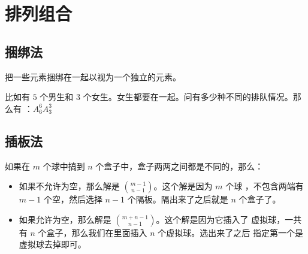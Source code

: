 \section{排列组合}
\label{sec:排列组合基本方法}



\subsection{捆绑法}

把一些元素捆绑在一起以视为一个独立的元素。

比如有 $5$ 个男生和 $3$ 个女生。女生都要在一起。问有多少种不同的排队情况。那么有
：$A_6^6 A_3^3$



\subsection{插板法}
\label{subsec:插板法} \label{subsec:插空法}

如果在 $m$ 个球中搞到 $n$ 个盒子中，盒子两两之间都是不同的，那么：
\begin{itemize}
    \item 如果不允许为空，那么解是 $m - 1 \choose n - 1$。这个解是因为 $m$ 个球
        ，不包含两端有 $m - 1$ 个空，然后选择 $n - 1$ 个隔板。隔出来了之后就是
        $n$ 个盒子了。
    \item 如果允许为空，那么解是 $m + n - 1 \choose n - 1$。这个解是因为它插入了
        虚拟球，一共有 $n$ 个盒子，那么我们在里面插入 $n$ 个虚拟球。选出来了之后
        指定第一个是虚拟球去掉即可。
\end{itemize}


